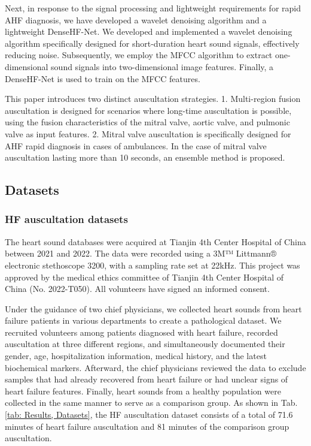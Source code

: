 Next, in response to the signal processing and lightweight requirements for rapid AHF diagnosis, we have developed a wavelet denoising algorithm and a lightweight DenseHF-Net. We developed and implemented a wavelet denoising algorithm specifically designed for short-duration heart sound signals, effectively reducing noise. Subsequently, we employ the MFCC algorithm to extract one-dimensional sound signals into two-dimensional image features. Finally, a DenseHF-Net is used to train on the MFCC features.

This paper introduces two distinct auscultation strategies. 1. Multi-region fusion auscultation is designed for
scenarios where long-time auscultation is possible, using the fusion characteristics of the mitral valve, aortic valve, and pulmonic valve as input features. 2. Mitral valve auscultation is specifically
designed for AHF rapid diagnosis in cases of ambulances. In the case of mitral valve auscultation lasting more than 10 seconds, an ensemble method is proposed. 
\subsection{Datasets}
\subsubsection{HF auscultation datasets}
The heart sound databases were acquired at Tianjin 4th Center Hospital of China between 2021 and 2022. The data were recorded using a 3M™ Littmann® electronic stethoscope 3200, with a sampling rate set at 22kHz. This project was approved by the medical ethics committee of Tianjin 4th Center Hospital of China (No. 2022-T050). All volunteers have signed an informed consent. 

Under the guidance of two chief physicians, we collected heart sounds from heart failure patients in various departments to create a pathological dataset. We recruited volunteers among patients diagnosed with heart failure, recorded auscultation at three different regions, and simultaneously documented their gender, age, hospitalization information, medical history, and the latest biochemical markers. Afterward, the chief physicians reviewed the data to exclude samples that had already recovered from heart failure or had unclear signs of heart failure features. Finally, heart sounds from a healthy population were collected in the same manner to serve as a comparison group. As shown in Tab. \ref{tab: Results, Datasets}, the HF auscultation dataset consists of a total of 71.6 minutes of heart failure auscultation and 81 minutes of the comparison group auscultation.

